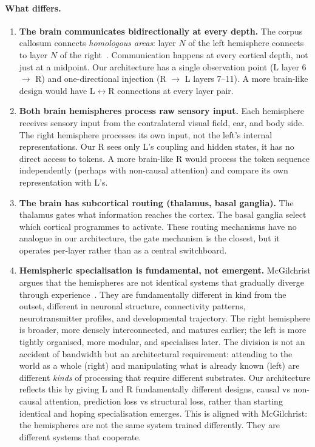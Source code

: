 \documentclass[11pt, a4paper]{article}
\theoremstyle{plain}
\theoremstyle{definition}
\theoremstyle{remark}
\begin{document}
\paragraph{What differs.}

\begin{enumerate}[nosep]
\item \textbf{The brain communicates bidirectionally at every depth.}
The corpus callosum connects \emph{homologous areas}: layer $N$ of the left hemisphere connects to layer $N$ of the right~\cite{ringo1994hemispheric}.
Communication happens at every cortical depth, not just at a midpoint.
Our architecture has a single observation point (L layer 6 $\to$ R) and one-directional injection (R $\to$ L layers 7--11).
A more brain-like design would have L$\leftrightarrow$R connections at every layer pair.

\item \textbf{Both brain hemispheres process raw sensory input.}
Each hemisphere receives sensory input from the contralateral visual field, ear, and body side.
The right hemisphere processes its own input, not the left's internal representations.
Our R sees only L's coupling and hidden states, it has no direct access to tokens.
A more brain-like R would process the token sequence independently (perhaps with non-causal attention) and compare its own representation with L's.

\item \textbf{The brain has subcortical routing (thalamus, basal ganglia).}
The thalamus gates what information reaches the cortex.
The basal ganglia select which cortical programmes to activate.
These routing mechanisms have no analogue in our architecture, the gate mechanism is the closest, but it operates per-layer rather than as a central switchboard.

\item \textbf{Hemispheric specialisation is fundamental, not emergent.}
McGilchrist argues that the hemispheres are not identical systems that gradually diverge through experience~\cite{mcgilchrist2021matter}.
They are fundamentally different in kind from the outset, different in neuronal structure, connectivity patterns, neurotransmitter profiles, and developmental trajectory.
The right hemisphere is broader, more densely interconnected, and matures earlier; the left is more tightly organised, more modular, and specialises later.
The division is not an accident of bandwidth but an architectural requirement: attending to the world as a whole (right) and manipulating what is already known (left) are different \emph{kinds} of processing that require different substrates.
Our architecture reflects this by giving L and R fundamentally different designs, causal vs non-causal attention, prediction loss vs structural loss, rather than starting identical and hoping specialisation emerges.
This is aligned with McGilchrist: the hemispheres are not the same system trained differently. They are different systems that cooperate.


\end{enumerate}
\end{document}
